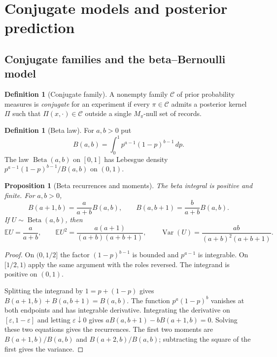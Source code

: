 \documentclass[11pt,oneside]{book}
\newtheorem{proposition}[theorem]{Proposition}
\theoremstyle{definition}
\newtheorem{definition}[theorem]{Definition}
\theoremstyle{remark}
\begin{document}
\section{Conjugate models and posterior prediction}
\label{sec:bayesian-conjugate-prediction}

\subsection{Conjugate families and the beta--Bernoulli model}
\label{subsec:bayesian-beta-bernoulli}

\begin{definition}[Conjugate family]
\label{def:bayesian-conjugate-family}
A nonempty family $\mathcal C$ of prior probability measures is
\emph{conjugate} for an experiment if every $\pi\in\mathcal C$ admits
a posterior kernel $\Pi$ such that $\Pi(x,\cdot)\in\mathcal C$ outside
a single $M_\pi$-null set of records.
\end{definition}

\begin{definition}[Beta law]
\label{def:bayesian-beta-law}
For $a,b>0$ put
\[
B(a,b)=\int_0^1 p^{a-1}(1-p)^{b-1}\,dp.
\]
The law $\operatorname{Beta}(a,b)$ on $[0,1]$ has Lebesgue density
$p^{a-1}(1-p)^{b-1}/B(a,b)$ on $(0,1)$.
\end{definition}

\begin{proposition}[Beta recurrences and moments]
\label{prop:bayesian-beta-moments}
The beta integral is positive and finite. For $a,b>0$,
\[
B(a+1,b)=\frac{a}{a+b}B(a,b),\qquad
B(a,b+1)=\frac{b}{a+b}B(a,b).
\]
If $U\sim\operatorname{Beta}(a,b)$, then
\[
\mathbb E U=\frac{a}{a+b},\qquad
\mathbb E U^2=\frac{a(a+1)}{(a+b)(a+b+1)},\qquad
\operatorname{Var}(U)=\frac{ab}{(a+b)^2(a+b+1)}.
\]
\end{proposition}
\begin{proof}
On $(0,1/2]$ the factor $(1-p)^{b-1}$ is bounded and $p^{a-1}$
is integrable. On $[1/2,1)$ apply the same argument with the roles
reversed. The integrand is positive on $(0,1)$.

Splitting the integrand by $1=p+(1-p)$ gives
$B(a+1,b)+B(a,b+1)=B(a,b)$. The function $p^a(1-p)^b$ vanishes
at both endpoints and has integrable derivative. Integrating the
derivative on $[\varepsilon,1-\varepsilon]$ and letting
$\varepsilon\downarrow0$ gives
$aB(a,b+1)-bB(a+1,b)=0$. Solving these two equations gives the
recurrences. The first two moments are $B(a+1,b)/B(a,b)$ and
$B(a+2,b)/B(a,b)$; subtracting the square of the first gives the
variance.
\end{proof}
\end{document}
